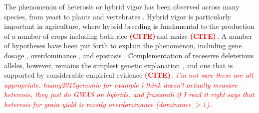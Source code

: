 \documentclass[twoside,twocolumn, letterpaper]{article}
\newcommand{\citex}{\textcolor{red}{\bf (CITE)\,}}
\newcommand{\jri}[1]{\textcolor{red}{ \emph{ #1}} }
\begin{document}
The phenomenon of heterosis or hybrid vigor has been observed across many species, from yeast \citep{Shapira2014} to plants \citep{shull1908composition} and vertebrates \citep{Gama2013}. 
Hybrid vigor is particularly important in agriculture, where hybrid breeding is fundamental to the production of a number of crops including both rice \citex and maize \citex .
A number of hypotheses have been put forth to explain the phenomenon, including gene dosage \citep{birchler2003search}, overdominance \citep{east1936heterosis, schwartz1973single, krieger2010flowering}, 
and epistasis \citep{minvielle1987dominance, schnell1992multiplicative}. 
Complementation of recessive deleterious alleles, however, remains the simplest genetic explanation \citep{Charlesworth2009}, and one that is supported by considerable empirical evidence \citex \citep{xiao1995dominance, frascaroli2007classical}.
\jri{i'm not sure these are all appropriate. huang2015genomic for example i think doesn't actually measure heterosis, they just do GWAS on hybrids. and frascaroli if I read it right says that heterosis for grain yield is mostly overdominance (dominance $>1$).}




\end{document}
